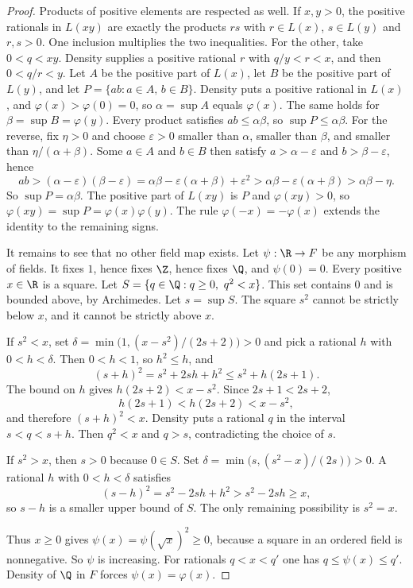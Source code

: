 \begin{proof}
Products of positive elements are respected as well. If $x,y>0$, the positive rationals in $L(xy)$ are exactly the products $rs$ with $r\in L(x)$, $s\in L(y)$ and $r,s>0$. One inclusion multiplies the two inequalities. For the other, take $0<q<xy$. Density supplies a positive rational $r$ with $q/y<r<x$, and then $0<q/r<y$.
Let $A$ be the positive part of $L(x)$, let $B$ be the positive part of $L(y)$, and let $P=\{ab:a\in A,\,b\in B\}$. Density puts a positive rational in $L(x)$, and $\varphi(x)>\varphi(0)=0$, so $\alpha=\sup A$ equals $\varphi(x)$. The same holds for $\beta=\sup B=\varphi(y)$. Every product satisfies $ab\le\alpha\beta$, so $\sup P\le\alpha\beta$. For the reverse, fix $\eta>0$ and choose $\varepsilon>0$ smaller than $\alpha$, smaller than $\beta$, and smaller than $\eta/(\alpha+\beta)$. Some $a\in A$ and $b\in B$ then satisfy $a>\alpha-\varepsilon$ and $b>\beta-\varepsilon$, hence
\[
ab>(\alpha-\varepsilon)(\beta-\varepsilon)=\alpha\beta-\varepsilon(\alpha+\beta)+\varepsilon^2>\alpha\beta-\varepsilon(\alpha+\beta)>\alpha\beta-\eta.
\]
So $\sup P=\alpha\beta$. The positive part of $L(xy)$ is $P$ and $\varphi(xy)>0$, so $\varphi(xy)=\sup P=\varphi(x)\varphi(y)$. The rule $\varphi(-x)=-\varphi(x)$ extends the identity to the remaining signs.

It remains to see that no other field map exists. Let $\psi:\R\to F$ be any morphism of fields. It fixes $1$, hence fixes $\Z$, hence fixes $\Q$, and $\psi(0)=0$. Every positive $x\in\R$ is a square. Let $S=\{q\in\Q:q\ge 0,\ q^2<x\}$. This set contains $0$ and is bounded above, by Archimedes. Let $s=\sup S$. The square $s^2$ cannot be strictly below $x$, and it cannot be strictly above $x$.

If $s^2<x$, set $\delta=\min\bigl(1,(x-s^2)/(2s+2)\bigr)>0$ and pick a rational $h$ with $0<h<\delta$. Then $0<h<1$, so $h^2\le h$, and
\[
(s+h)^2=s^2+2sh+h^2\le s^2+h(2s+1).
\]
The bound on $h$ gives $h(2s+2)<x-s^2$. Since $2s+1<2s+2$,
\[
h(2s+1)<h(2s+2)<x-s^2,
\]
and therefore $(s+h)^2<x$.
Density puts a rational $q$ in the interval $s<q<s+h$. Then $q^2<x$ and $q>s$, contradicting the choice of $s$.

If $s^2>x$, then $s>0$ because $0\in S$. Set $\delta=\min\bigl(s,(s^2-x)/(2s)\bigr)>0$. A rational $h$ with $0<h<\delta$ satisfies
\[
(s-h)^2=s^2-2sh+h^2>s^2-2sh\ge x,
\]
so $s-h$ is a smaller upper bound of $S$. The only remaining possibility is $s^2=x$.

Thus $x\ge 0$ gives $\psi(x)=\psi(\sqrt{x})^2\ge 0$, because a square in an ordered field is nonnegative. So $\psi$ is increasing. For rationals $q<x<q'$ one has $q\le\psi(x)\le q'$. Density of $\Q$ in $F$ forces $\psi(x)=\varphi(x)$.
\end{proof}

